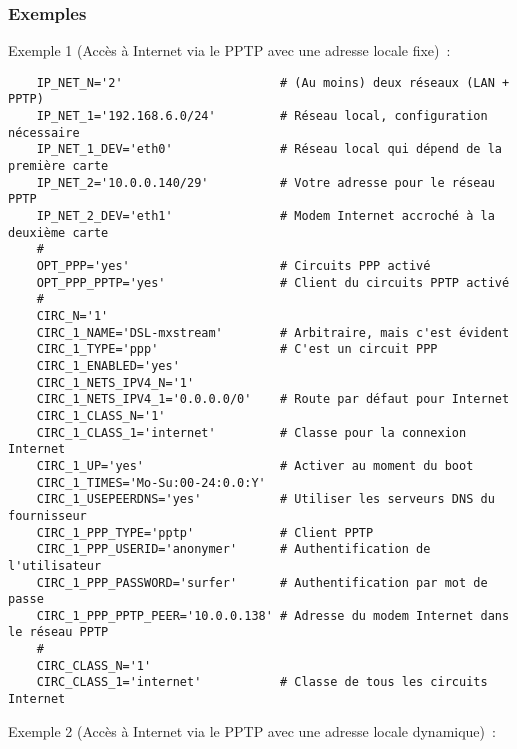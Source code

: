 \subsubsection{Exemples}

\noindent
Exemple 1 (Accès à Internet via le PPTP avec une adresse locale fixe)~:

\begin{example}
\begin{verbatim}
    IP_NET_N='2'                      # (Au moins) deux réseaux (LAN + PPTP)
    IP_NET_1='192.168.6.0/24'         # Réseau local, configuration nécessaire
    IP_NET_1_DEV='eth0'               # Réseau local qui dépend de la première carte
    IP_NET_2='10.0.0.140/29'          # Votre adresse pour le réseau PPTP
    IP_NET_2_DEV='eth1'               # Modem Internet accroché à la deuxième carte
    #
    OPT_PPP='yes'                     # Circuits PPP activé
    OPT_PPP_PPTP='yes'                # Client du circuits PPTP activé
    #
    CIRC_N='1'
    CIRC_1_NAME='DSL-mxstream'        # Arbitraire, mais c'est évident
    CIRC_1_TYPE='ppp'                 # C'est un circuit PPP
    CIRC_1_ENABLED='yes'
    CIRC_1_NETS_IPV4_N='1'
    CIRC_1_NETS_IPV4_1='0.0.0.0/0'    # Route par défaut pour Internet
    CIRC_1_CLASS_N='1'
    CIRC_1_CLASS_1='internet'         # Classe pour la connexion Internet
    CIRC_1_UP='yes'                   # Activer au moment du boot
    CIRC_1_TIMES='Mo-Su:00-24:0.0:Y'
    CIRC_1_USEPEERDNS='yes'           # Utiliser les serveurs DNS du fournisseur
    CIRC_1_PPP_TYPE='pptp'            # Client PPTP
    CIRC_1_PPP_USERID='anonymer'      # Authentification de l'utilisateur
    CIRC_1_PPP_PASSWORD='surfer'      # Authentification par mot de passe
    CIRC_1_PPP_PPTP_PEER='10.0.0.138' # Adresse du modem Internet dans le réseau PPTP
    #
    CIRC_CLASS_N='1'
    CIRC_CLASS_1='internet'           # Classe de tous les circuits Internet
\end{verbatim}
\end{example}

\noindent
Exemple 2 (Accès à Internet via le PPTP avec une adresse locale dynamique)~:

